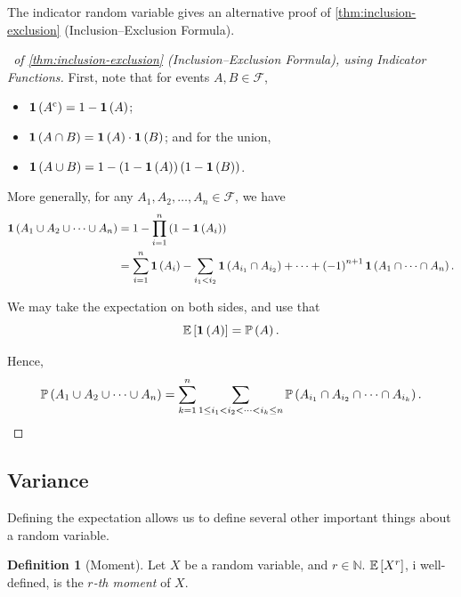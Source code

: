 \documentclass{article}
\theoremstyle{definition}
\newtheorem{definition}[theorem]{Definition}
\theoremstyle{remark}
\newcommand{\NN}{\mathbb{N}}
\newcommand{\Prob}{\mathbb{P}}
\newcommand{\Expt}{\mathbb{E}}
\newcommand{\eventSpace}{\mathcal{F}}
\newcommand{\compl}{^{\mathrm{c}}}
\newcommand{\indicator}{\mathbf{1}}
\begin{document}
The indicator random variable gives an alternative proof of \autoref{thm:inclusion-exclusion} (Inclusion--Exclusion Formula).

\begin{proof}[\proofname\ of \autoref{thm:inclusion-exclusion} (Inclusion--Exclusion Formula), using Indicator Functions]
    First, note that for events \(A, B \in \eventSpace\),
    \begin{itemize}
        \item \(\indicator\pqty{A\compl} = 1 - \indicator\pqty{A}\);
        \item \(\indicator\pqty{A \cap B} = \indicator\pqty{A} \cdot \indicator\pqty{B}\); and for the union,
        \item \(\indicator\pqty{A \cup B} = 1 - \pqty{1 - \indicator\pqty{A}} \pqty{1 - \indicator\pqty{B}}\).
    \end{itemize}

    More generally, for any \(A_1, A_2, \ldots, A_n \in \eventSpace\), we have
    \begin{align*}
        \indicator\pqty{A_1 \cup A_2 \cup \cdots \cup A_n} &= 1 - \prod_{i = 1}^{n} \pqty{1 - \indicator\pqty{A_i}} \\
        &= \sum_{i = 1}^{n} \indicator \pqty{A_i} - \sum_{i_1 < i_2} \indicator\pqty{A_{i_1} \cap A_{i_2}} + \cdots + \pqty{-1}^{n + 1} \indicator\pqty{A_1 \cap \cdots \cap A_n}.
    \end{align*}

    We may take the expectation on both sides, and use that
    \[
        \Expt\bqty{\indicator\pqty{A}} = \Prob\pqty{A}.
    \]

    Hence,
    \[
        \Prob\pqty{A_1 \cup A_2 \cup \cdots \cup A_n} = \sum_{k = 1}^{n} \sum_{1 \leq i_1 < i_2 < \cdots < i_k \leq n} \Prob\pqty{A_{i_1} \cap A_{i_2} \cap \cdots \cap A_{i_k}}.
    \]
\end{proof}

\subsection{Variance}

Defining the expectation allows us to define several other important things about a random variable.

\begin{definition}[Moment]
    \label{def:moment}%
    Let \(X\) be a random variable, and \(r \in \NN\). \(\Expt\bqty{X^r}\), i well-defined, is the \emph{\(r\)-th moment} of \(X\).
\end{definition}
\end{document}
